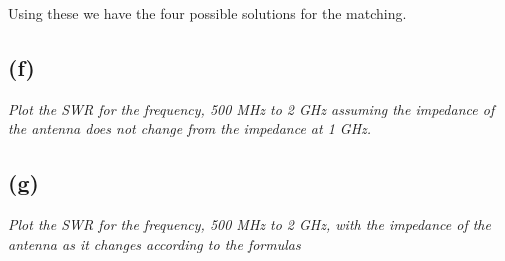 Using these we have the four possible solutions for the matching. 

\subsection{(f)}
\textit{Plot the SWR for the frequency, 500 MHz to 2 GHz assuming the impedance of the antenna does not
change from the impedance at 1 GHz.}\\

\subsection{(g)}
\textit{Plot the SWR for the frequency, 500 MHz to 2 GHz, with the impedance of the antenna as it changes
according to the formulas}\\